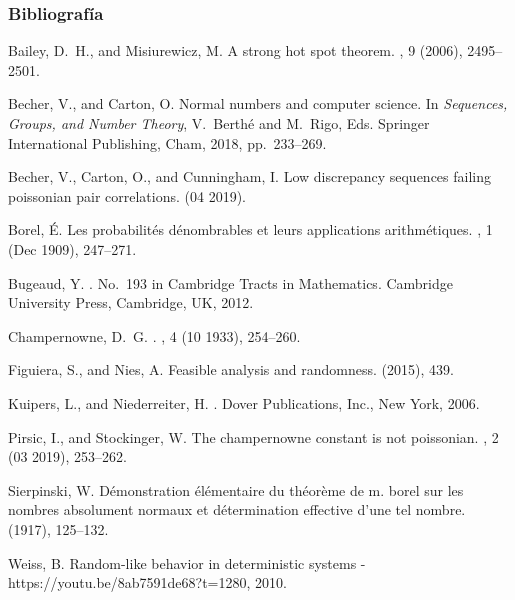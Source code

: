 \documentclass[10pt,mathserif]{beamer}%
\begin{document}
  
  \begin{frame}  
    \frametitle{Bibliografía}

  \begin{thebibliography}{1}
  
  \setlength{\parskip}{-0.5mm}
  {\tiny
    {\sc Bailey, D.~H., and Misiurewicz, M.}
    \newblock A strong hot spot theorem.
    , 9 (2006),
      2495--2501.
    
    {\sc Becher, V., and Carton, O.}
    \newblock Normal numbers and computer science.
    \newblock In {\em Sequences, Groups, and Number Theory}, V.~Berthé and
      M.~Rigo, Eds. Springer International Publishing, Cham, 2018, pp.~233--269.
    
    {\sc Becher, V., Carton, O., and Cunningham, I.}
    \newblock Low discrepancy sequences failing poissonian pair correlations.
     (04 2019).
    
    {\sc Borel, {\'E}.}
    \newblock Les probabilit{\'e}s d{\'e}nombrables et leurs applications
      arithm{\'e}tiques.
    , 1
      (Dec 1909), 247--271.
    
    {\sc Bugeaud, Y.}
    .
    \newblock No.~193 in Cambridge Tracts in Mathematics. Cambridge University
      Press, Cambridge, UK, 2012.
    
    {\sc Champernowne, D.~G.}
    .
    , 4 (10 1933),
      254--260.
    
    {\sc Figuiera, S., and Nies, A.}
    \newblock Feasible analysis and randomness.
     (2015), 439.
    
    {\sc Kuipers, L., and Niederreiter, H.}
    .
    \newblock Dover Publications, Inc., New York, 2006.
    
    {\sc Pirsic, I., and Stockinger, W.}
    \newblock The champernowne constant is not poissonian.
    , 2 (03 2019), 253--262.

    
    {\sc Sierpinski, W.}
    \newblock D\'emonstration \'el\'ementaire du th\'eor\`eme de m. borel sur les
      nombres absolument normaux et d\'etermination effective d'une tel nombre.
      (1917), 125--132.
    
    {\sc Weiss, B.}
    \newblock Random-like behavior in deterministic systems -
      https://youtu.be/8ab7591de68?t=1280, 2010.
  } 
    \end{thebibliography}  
  \end{frame}


 
\end{document}
